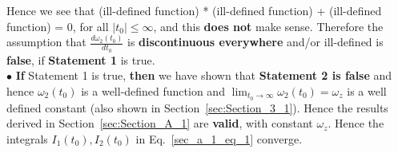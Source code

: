 \documentclass[11pt]{elsarticle}
\begin{document}
Hence  we see that (ill-defined function) * (ill-defined function) +  (ill-defined function) = 0, 
for all $|t_0| \leq \infty$, and this \textbf{does not} make sense. Therefore the assumption that $\frac{d\omega_2(t_0)}{dt_0}$ is \textbf{discontinuous everywhere} and/or ill-defined is \textbf{false}, if \textbf{Statement 1} is true.\\

$\bullet$ \textbf{If }Statement 1 is  true,\textbf{ then} we have shown that  \textbf{Statement 2 is false} and hence $\omega_{2}(t_0)$ is a well-defined function and $\lim_{t_0 \to \infty} \omega_{2}(t_0) = \omega_z$ is a well defined constant (also shown in Section~\ref{sec:Section_3_1}). Hence the results derived in Section~\ref{sec:Section_A_1} are \textbf{valid}, with constant $\omega_z$. Hence the integrals  $I_1(t_0), I_2(t_0)$ in Eq.~\ref{sec_a_1_eq_1} converge.\\





\end{document}
